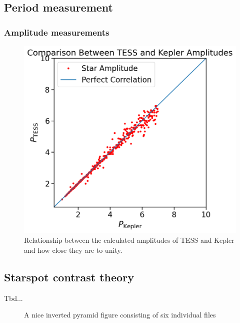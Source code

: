 \documentclass[twocolumn]{aastex631}
\begin{document}
\subsection{Period measurement}


\subsubsection{Amplitude measurements}


\begin{figure}[!htb]
  \centering
  \includegraphics[scale=0.5]{Comparison Between TESS and Kepler Amplitudes.png}
  \caption{Relationship between the calculated amplitudes of TESS and Kepler and how close they are to unity.}
\end{figure}
\FloatBarrier


\subsection{Starspot contrast theory}
Tbd...

\begin{figure}
  \gridline
    {
    {}
    {}}
  \caption{A nice inverted pyramid figure
    consisting of six individual files}
\end{figure}
\end{document}

